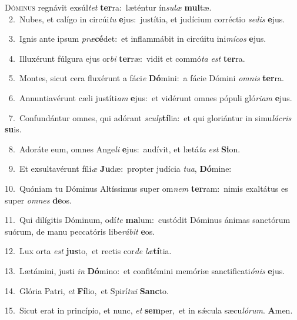 \lettrine{\initial\textcolor{\initialcolor}{D}}{óminus} regnávit exsúl\textit{tet} \textbf{ter}\-ra:~\star læténtur ín\-\textit{su}\-\textit{læ} \textbf{mul}\-tæ.\\
{\numbfont\textcolor{\numbcolor}{~2.}}~Nubes, et calígo in circúi\textit{tu} \textbf{e}\-jus:~\star justítia, et judícium corréctio \textit{se}\-\textit{dis} \textbf{e}\-jus.\par
{\numbfont\textcolor{\numbcolor}{~3.}}~Ignis ante ipsum \textit{præ}\-\textbf{cé}det:~\star et inflammábit in circúitu ini\-\textit{mí}\-\textit{cos} \textbf{e}\-jus.\par
{\numbfont\textcolor{\numbcolor}{~4.}}~Illuxérunt fúlgura ejus or\textit{bi} \textbf{ter}\-ræ:~\star vidit et commó\textit{ta} \textit{est} \textbf{ter}\-ra.\par
{\numbfont\textcolor{\numbcolor}{~5.}}~Montes, sicut cera fluxérunt a fáci\textit{e} \textbf{Dó}\-mini:~\star a fácie Dómini \textit{om}\-\textit{nis} \textbf{ter}\-ra.\par
{\numbfont\textcolor{\numbcolor}{~6.}}~Annuntiavérunt cæli justíti\textit{am} \textbf{e}\-jus:~\star et vidérunt omnes pópuli gló\-\textit{ri}\-\textit{am} \textbf{e}\-jus.\par
{\numbfont\textcolor{\numbcolor}{~7.}}~Confundántur omnes, qui adórant \textit{sculp}\-\textbf{tí}lia:~\star et qui gloriántur in simu\-\textit{lá}\-\textit{cris} \textbf{su}\-is.\par
{\numbfont\textcolor{\numbcolor}{~8.}}~Adoráte eum, omnes Ange\textit{li} \textbf{e}\-jus:~\star audívit, et lætá\textit{ta} \textit{est} \textbf{Si}\-on.\par
{\numbfont\textcolor{\numbcolor}{~9.}}~Et exsultavérunt fíli\textit{æ} \textbf{Ju}\-dæ:~\star propter judícia \textit{tu}\-\textit{a}, \textbf{Dó}\-mine:\par
{\numbfont\textcolor{\numbcolor}{10.}}~Quóniam tu Dóminus Altíssimus super om\textit{nem} \textbf{ter}\-ram:~\star nimis exaltátus es super \textit{om}\-\textit{nes} \textbf{de}\-os.\par
{\numbfont\textcolor{\numbcolor}{11.}}~Qui dilígitis Dóminum, odí\textit{te} \textbf{ma}\-lum:~\star custódit Dóminus ánimas sanctórum suórum, de manu peccatóris libe\-\textit{rá}\-\textit{bit} \textbf{e}\-os.\par
{\numbfont\textcolor{\numbcolor}{12.}}~Lux orta \textit{est} \textbf{jus}\-to,~\star et rectis cor\textit{de} \textit{læ}\-\textbf{tí}tia.\par
{\numbfont\textcolor{\numbcolor}{13.}}~Lætámini, justi \textit{in} \textbf{Dó}\-mino:~\star et confitémini memóriæ sanctificati\-\textit{ó}\-\textit{nis} \textbf{e}\-jus.\par
{\numbfont\textcolor{\numbcolor}{14.}}~Glória Patri, \textit{et} \textbf{Fí}\-lio,~\star et Spirí\-\textit{tu}\-\textit{i} \textbf{Sanc}\-to.\par
{\numbfont\textcolor{\numbcolor}{15.}}~Sicut erat in princípio, et nunc, \textit{et} \textbf{sem}\-per,~\star et in sǽcula sæcu\-\textit{ló}\-\textit{rum}. \textbf{A}\-men.\par
